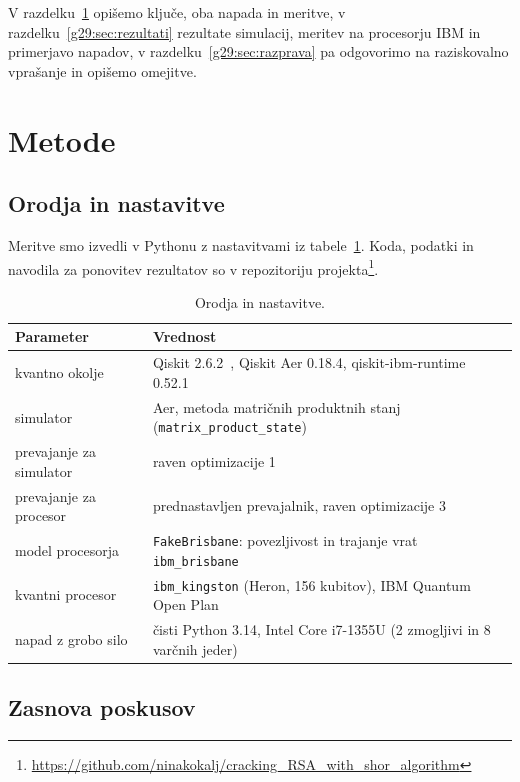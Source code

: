 V razdelku~\ref{g29:sec:metode} opišemo ključe, oba napada in meritve, v razdelku~\ref{g29:sec:rezultati} rezultate simulacij, meritev na procesorju IBM in primerjavo napadov, v razdelku~\ref{g29:sec:razprava} pa odgovorimo na raziskovalno vprašanje in opišemo omejitve.


\section{Metode}
\label{g29:sec:metode}

\subsection{Orodja in nastavitve}
\label{g29:sec:orodja}

Meritve smo izvedli v Pythonu z nastavitvami iz tabele~\ref{g29:tab:nastavitve}. Koda, podatki in navodila za ponovitev rezultatov so v repozitoriju projekta\footnote{\url{https://github.com/ninakokalj/cracking_RSA_with_shor_algorithm}}.

\begin{table}[htbp]
\caption{Orodja in nastavitve.}
\label{g29:tab:nastavitve}
\centering
\footnotesize
\setlength{\tabcolsep}{5pt}
\begin{tabular}{ll}
\toprule
Parameter & Vrednost \\
\midrule
kvantno okolje & Qiskit 2.6.2~\cite{qiskit2024}, Qiskit Aer 0.18.4, qiskit-ibm-runtime 0.52.1 \\
simulator & Aer, metoda matričnih produktnih stanj (\texttt{matrix\_product\_state}) \\
prevajanje za simulator & raven optimizacije 1 \\
prevajanje za procesor & prednastavljen prevajalnik, raven optimizacije 3 \\
model procesorja & \texttt{FakeBrisbane}: povezljivost in trajanje vrat \texttt{ibm\_brisbane} \\
kvantni procesor & \texttt{ibm\_kingston} (Heron, 156 kubitov), IBM Quantum Open Plan \\
napad z grobo silo & čisti Python 3.14, Intel Core i7-1355U (2 zmogljivi in 8 varčnih jeder) \\
\bottomrule
\end{tabular}
\end{table}

\subsection{Zasnova poskusov}
\label{g29:sec:poskusi}

